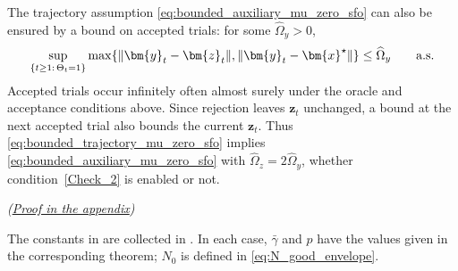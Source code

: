 \documentclass{article}
\begin{document}
\begin{proposition}
\label{rem:gc_trajectory}
The trajectory assumption \eqref{eq:bounded_auxiliary_mu_zero_sfo}
can also be ensured by a bound on accepted trials: for some
\(\widehat\Omega_y>0\),
\begin{equation}\label{eq:bounded_trajectory_mu_zero_sfo}
\sup_{\{t\ge1:\,\Theta_t=1\}}
\max\{\|\bm{y}_t-\bm{z}_t\|,\|\bm{y}_t-\bm{x}^\star\|\}
\le\widehat\Omega_y\qquad\textnormal{a.s.}
\end{equation}
Accepted trials occur infinitely often almost surely under the oracle and acceptance conditions above. Since rejection leaves $\bm{z}_t$ unchanged, a bound at the next accepted trial also bounds the current $\bm{z}_t$. Thus \eqref{eq:bounded_trajectory_mu_zero_sfo} implies
\eqref{eq:bounded_auxiliary_mu_zero_sfo} with $\widehat\Omega_z=2\widehat\Omega_y$, whether condition~\eqref{Check_2} is enabled or not.
\par\nobreak\hfill\textnormal{\small\itshape(\hyperref[proof:gc_trajectory]{Proof in the appendix})}\par
\end{proposition}

The constants in 
are collected in . In each case, \(\bar\gamma\)
and \(p\) have the values given in the corresponding theorem; \(N_0\) is
defined in \eqref{eq:N_good_envelope}.
\end{document}
